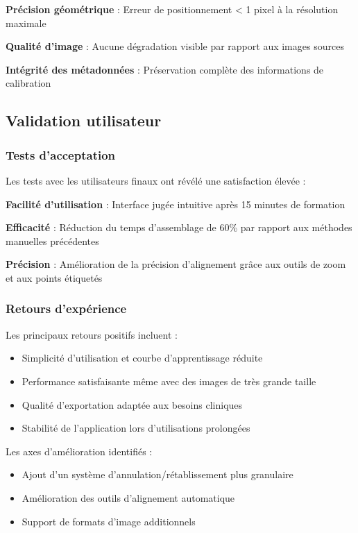 \documentclass[12pt,a4paper]{report}
\begin{document}
\textbf{Précision géométrique} : Erreur de positionnement < 1 pixel à la résolution maximale

\textbf{Qualité d'image} : Aucune dégradation visible par rapport aux images sources

\textbf{Intégrité des métadonnées} : Préservation complète des informations de calibration

\subsection{Validation utilisateur}

\subsubsection{Tests d'acceptation}

Les tests avec les utilisateurs finaux ont révélé une satisfaction élevée :

\textbf{Facilité d'utilisation} : Interface jugée intuitive après 15 minutes de formation

\textbf{Efficacité} : Réduction du temps d'assemblage de 60\% par rapport aux méthodes manuelles précédentes

\textbf{Précision} : Amélioration de la précision d'alignement grâce aux outils de zoom et aux points étiquetés

\subsubsection{Retours d'expérience}

Les principaux retours positifs incluent :
\begin{itemize}
\item Simplicité d'utilisation et courbe d'apprentissage réduite
\item Performance satisfaisante même avec des images de très grande taille
\item Qualité d'exportation adaptée aux besoins cliniques
\item Stabilité de l'application lors d'utilisations prolongées
\end{itemize}

Les axes d'amélioration identifiés :
\begin{itemize}
\item Ajout d'un système d'annulation/rétablissement plus granulaire
\item Amélioration des outils d'alignement automatique
\item Support de formats d'image additionnels
\end{itemize}
\end{document}
